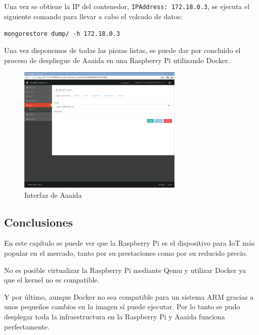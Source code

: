 Una vez se obtiene la IP del contenedor, \texttt{IPAddress: 172.18.0.3}, se ejecuta el siguiente comando para llevar a cabo el volcado de datos:

\begin{center}
\texttt{mongorestore dump/ -h 172.18.0.3}
\end{center}

Una vez disponemos de todas las piezas listas, se puede dar por concluido el proceso de despliegue de Aaaida en una Raspberry Pi utilizando Docker. 

\begin{figure}[htb]
\begin{center}
\includegraphics[width=0.70\textwidth]{./setup/aaaidaCoIoTe}
\caption{Interfaz de Aaaida}
\label{aidaCoI:aaaidaCoiote}
\end{center}
\end{figure} 
 
 \subsection{Conclusiones} 
 
En este capítulo se puede ver que la Raspberry Pi es el dispositivo para IoT más popular en el mercado, tanto por su prestaciones como por su reducido precio.
 
No es posible virtualizar la Raspberry Pi mediante Qemu y utilizar Docker ya que el kernel no es compatible. 

Y por último, aunque Docker no sea compatible para un sistema ARM gracias a unos pequeños cambios en la imagen sí puede ejecutar. Por lo tanto se pudo desplegar toda la infraestructura en la Raspberry Pi y Aaaida funciona perfectamente. 